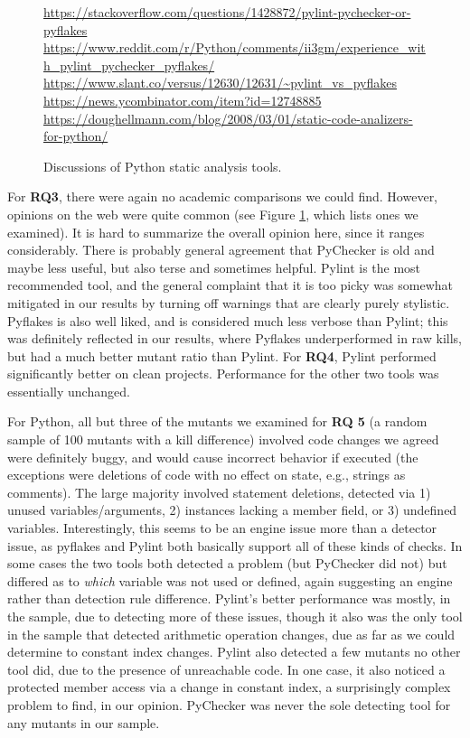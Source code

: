\begin{figure}
  {\scriptsize
    \raggedright
  \url{https://stackoverflow.com/questions/1428872/pylint-pychecker-or-pyflakes}\\
  \url{https://www.reddit.com/r/Python/comments/ii3gm/experience_with_pylint_pychecker_pyflakes/}\\
  \url{https://www.slant.co/versus/12630/12631/~pylint_vs_pyflakes}\\
  \url{https://news.ycombinator.com/item?id=12748885}\\
  \url{https://doughellmann.com/blog/2008/03/01/static-code-analizers-for-python/}\\
  }
\caption{Discussions of Python static analysis tools.}
\label{fig:blogpython}
\end{figure}

For {\bf RQ3}, there were again no academic comparisons we could find.  However, opinions on the web were quite common (see Figure \ref{fig:blogpython}, which lists ones we examined).  It is hard to summarize the overall opinion here, since it ranges considerably.  There is probably general agreement that PyChecker is old and maybe less useful, but also terse and sometimes helpful.  Pylint is the most recommended tool, and the general complaint that it is too picky was somewhat mitigated in our results by turning off warnings that are clearly purely stylistic.  Pyflakes is also well liked, and is considered much less verbose than Pylint; this was definitely reflected in our results, where Pyflakes underperformed in raw kills, but had a much better mutant ratio than Pylint.
For {\bf RQ4}, Pylint performed significantly better on clean projects.  Performance for the other two tools was essentially unchanged.

For Python, all but three of the mutants we examined for {\bf RQ 5} (a random sample of 100 mutants with a kill difference) involved code changes we agreed were definitely buggy, and would cause incorrect behavior if executed (the exceptions were deletions of code with no effect on state, e.g., strings as comments).  The large majority involved statement deletions, detected via 1) unused variables/arguments, 2) instances lacking a member field, or 3) undefined variables.  Interestingly, this seems to be an engine issue more than a detector issue, as pyflakes and Pylint both basically support all of these kinds of checks.  In some cases the two tools both detected a problem (but PyChecker did not) but differed as to \emph{which} variable was not used or defined, again suggesting an engine rather than detection rule difference.  Pylint's better performance was mostly, in the sample, due to detecting more of these issues, though it also was the only tool in the sample that detected arithmetic operation changes, due as far as we could determine to constant index changes.  Pylint also detected a few mutants no other tool did, due to the presence of unreachable code.  In one case, it also noticed a protected member access via a change in constant index, a surprisingly complex problem to find, in our opinion.  PyChecker was never the sole detecting tool for any mutants in our sample.


